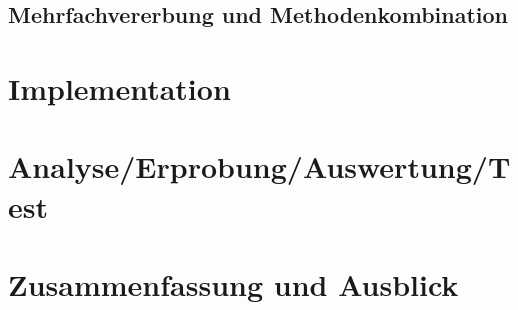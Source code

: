 \section{Mehrfachvererbung und Methodenkombination}

\chapter{Implementation}  %
\label{implementation}

\chapter{Analyse/Erprobung/Auswertung/Test}

\chapter{Zusammenfassung und Ausblick}



 



